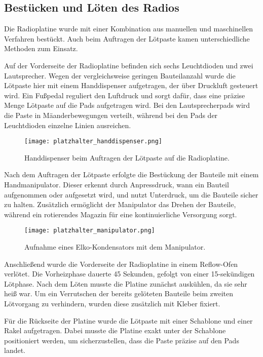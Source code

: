\subsection{Bestücken und Löten des Radios}
Die Radioplatine wurde mit einer Kombination aus manuellen und maschinellen Verfahren bestückt. Auch beim Auftragen der Lötpaste kamen unterschiedliche Methoden zum Einsatz.

Auf der Vorderseite der Radioplatine befinden sich sechs Leuchtdioden und zwei Lautsprecher. Wegen der vergleichsweise geringen Bauteilanzahl wurde die Lötpaste hier mit einem Handdispenser aufgetragen, der über Druckluft gesteuert wird. Ein Fußpedal reguliert den Luftdruck und sorgt dafür, dass eine präzise Menge Lötpaste auf die Pads aufgetragen wird. Bei den Lautsprecherpads wird die Paste in Mäanderbewegungen verteilt, während bei den Pads der Leuchtdioden einzelne Linien ausreichen.

\begin{figure}[h!]
    \centering
    \texttt{[image: platzhalter\_handdispenser.png]}
    \caption{Handdispenser beim Auftragen der Lötpaste auf die Radioplatine.}
    \label{fig:handdispenser}
\end{figure}

Nach dem Auftragen der Lötpaste erfolgte die Bestückung der Bauteile mit einem Handmanipulator. Dieser erkennt durch Anpressdruck, wann ein Bauteil aufgenommen oder aufgesetzt wird, und nutzt Unterdruck, um die Bauteile sicher zu halten. Zusätzlich ermöglicht der Manipulator das Drehen der Bauteile, während ein rotierendes Magazin für eine kontinuierliche Versorgung sorgt.

\begin{figure}[h!]
    \centering
    \texttt{[image: platzhalter\_manipulator.png]}
    \caption{Aufnahme eines Elko-Kondensators mit dem Manipulator.}
    \label{fig:manipulator}
\end{figure}

Anschließend wurde die Vorderseite der Radioplatine in einem Reflow-Ofen verlötet. Die Vorheizphase dauerte 45 Sekunden, gefolgt von einer 15-sekündigen Lötphase. Nach dem Löten musste die Platine zunächst auskühlen, da sie sehr heiß war. Um ein Verrutschen der bereits gelöteten Bauteile beim zweiten Lötvorgang zu verhindern, wurden diese zusätzlich mit Kleber fixiert.

Für die Rückseite der Platine wurde die Lötpaste mit einer Schablone und einer Rakel aufgetragen. Dabei musste die Platine exakt unter der Schablone positioniert werden, um sicherzustellen, dass die Paste präzise auf den Pads landet.

